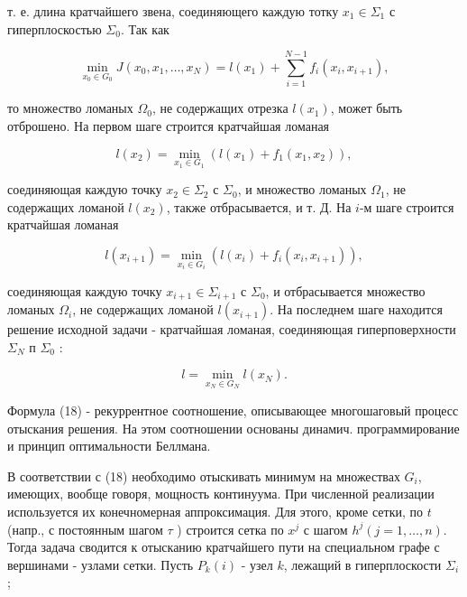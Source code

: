 \documentclass[10pt]{article}
\begin{document}
т. е. длина кратчайшего звена, соединяющего каждую тотку $x_{1} \in \Sigma_{1}$ с гиперплоскостью $\Sigma_{0}$. Так как



\[

\min _{x_{0} \in G_{0}} J\left(x_{0}, x_{1}, \ldots, x_{N}\right)=l\left(x_{1}\right)+\sum_{i=1}^{N-1} f_{i}\left(x_{i}, x_{i+1}\right),

\]



то множество ломаных $\Omega_{0}$, не содержащих отрезка $l\left(x_{1}\right)$, может быть отброшено. На первом шаге строится кратчайшая ломаная



\[

l\left(x_{2}\right)=\min _{x_{1} \in G_{1}}\left(l\left(x_{1}\right)+f_{1}\left(x_{1}, x_{2}\right)\right),

\]



соединяющая каждую точку $x_{2} \in \Sigma_{2}$ с $\Sigma_{0}$, и множество ломаных $\Omega_{1}$, не содержащих ломаной $l\left(x_{2}\right)$, также отбрасывается, и т. Д. На $i$-м шаге строится кратчайшая ломаная



\[

l\left(x_{i+1}\right)=\min _{x_{i} \in G_{i}}\left(l\left(x_{i}\right)+f_{i}\left(x_{i}, x_{i+1}\right)\right),

\]



соединяющая каждую точку $x_{i+1} \in \Sigma_{i+1}$ с $\Sigma_{0}$, и отбрасывается множество ломаных $\Omega_{i}$, не содержащих ломаной $l\left(x_{i+1}\right)$. На последнем шаге находится решение исходной задачи - кратчайшая ломаная, соединяющая гиперповерхности $\Sigma_{N}$ п $\Sigma_{0}$ :



\[

l=\min _{x_{N} \in G_{N}} l\left(x_{N}\right) .

\]



Формула (18) - рекуррентное соотношение, описывающее многошаговый процесс отыскания решения. На этом соотношении основаны динамич. программирование и принцип оптимальности Беллмана.



В соответствии с (18) необходимо отыскивать минимум на множествах $G_{i}$, имеющих, вообще говоря, мощность континуума. При численной реализации используется их конечномерная аппроксимация. Для этого, кроме сетки, по $t$ (напр., с постоянным шагом $\tau$ ) строится сетка по $x^{j}$ с шагом $h^{j}(j=1, \ldots, n)$. Тогда задача сводится к отысканию кратчайшего пути на специальном графе с вершинами - узлами сетки. Пусть $P_{k}(i)$ - узел $k$, лежащий в гиперплоскости $\Sigma_{i}$;
\end{document}
